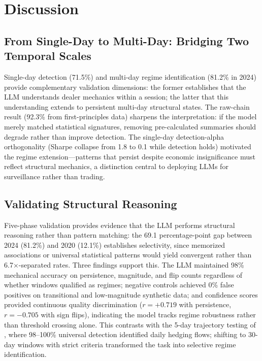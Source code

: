 \section{Discussion}
\label{sec:discussion}

\subsection{From Single-Day to Multi-Day: Bridging Two Temporal Scales}

Single-day detection (71.5\%) and multi-day regime identification (81.2\% in 2024) provide complementary validation dimensions: the former establishes that the LLM understands dealer mechanics within a session; the latter that this understanding extends to persistent multi-day structural states. The raw-chain result (92.3\% from first-principles data) sharpens the interpretation: if the model merely matched statistical signatures, removing pre-calculated summaries should degrade rather than improve detection. The single-day detection-alpha orthogonality (Sharpe collapse from 1.8 to 0.1 while detection holds) motivated the regime extension---patterns that persist despite economic insignificance must reflect structural mechanics, a distinction central to deploying LLMs for surveillance rather than trading.

\subsection{Validating Structural Reasoning}

Five-phase validation provides evidence that the LLM performs structural reasoning rather than pattern matching: the 69.1 percentage-point gap between 2024 (81.2\%) and 2020 (12.1\%) establishes selectivity, since memorized associations or universal statistical patterns would yield convergent rather than 6.7$\times$-separated rates. Three findings support this. The LLM maintained 98\% mechanical accuracy on persistence, magnitude, and flip counts regardless of whether windows qualified as regimes; negative controls achieved 0\% false positives on transitional and low-magnitude synthetic data; and confidence scores provided continuous quality discrimination ($r = +0.719$ with persistence, $r = -0.705$ with sign flips), indicating the model tracks regime robustness rather than threshold crossing alone. This contrasts with the 5-day trajectory testing of \citet{regan2025obfuscation}, where 98--100\% universal detection identified daily hedging flows; shifting to 30-day windows with strict criteria transformed the task into selective regime identification.

